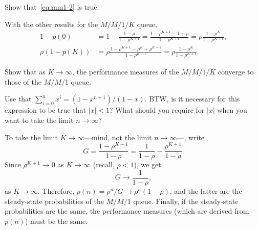 \documentclass[queueing-book.tex]{subfiles}
\begin{document}
\begin{exercise}\label{ex:l-33}
Show that~\cref{eq:mm1-2} is true.
\begin{solution}
With the other results for the $M/M/1/K$ queue,
\begin{align*}
  1-p(0) &= 1-\frac{1-\rho}{1-\rho^{K+1}} = \frac{1-\rho^{K+1} - 1 + \rho}{1-\rho^{K+1}} = \rho \frac{1-\rho^{K}}{1-\rho^{K+1}}, \\
  \rho (1-p(K)) &= \rho \frac{1-\rho^{K+1} - \rho^K + \rho^{K+1}}{1-\rho^{K+1}} = \rho \frac{1-\rho^{K}}{1-\rho^{K+1}}.
\end{align*}
\end{solution}
\end{exercise}

\begin{exercise}\label{ex:40}
 Show that as $K\to\infty$, the performance measures of the $M/M/1/K$ converge to those of the $M/M/1$ queue.
\begin{hint}
Use that $\sum_{i=0}^n x^i = (1-x^{n+1})/(1-x)$. BTW, is it
 necessary for this expression to be true that $|x|<1$? What should
 you require for $|x|$ when you want to take the limit
 $n\to\infty$?
\end{hint}
\begin{solution}
To take the limit $K\to\infty$---mind, not the limit $n\to\infty$---, write
\begin{equation*}
G= \frac{1-\rho^{K+1}}{1-\rho} = \frac{1}{1-\rho} -\frac{\rho^{K+1}}{1-\rho}.
\end{equation*}
Since $\rho^{K+1}\to 0$ as $K\to \infty$ (recall, $\rho<1$), we get
\begin{equation*}
G \to \frac{1}{1-\rho},
\end{equation*}
as $K\to\infty$. Therefore, $p(n)=\rho^n/G \to \rho^n(1-\rho)$, and
the latter are the steady-state probabilities of the $M/M/1$
queue. Finally, if the steady-state probabilities are the same, the
performance measures (which are derived from $p(n)$) must be the same.
\end{solution}
\end{exercise}
\end{document}
